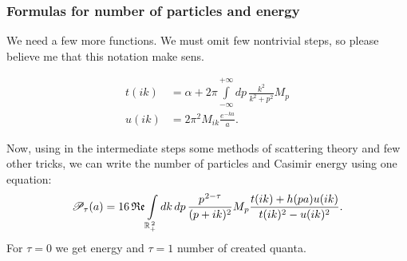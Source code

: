 \documentclass[10pt,t]{beamer}
\begin{document}
\begin{frame}
  \frametitle{Formulas for number of particles and energy}



  We need a few more functions. We must omit few nontrivial
  steps, so please believe me that this notation make sens.

  \vspace{-2em}



  \begin{subequations}

    \begin{align}
      \label{eq:Scalar-field-and-two-quasi-deltas-08-A}
      t( i k )
      &=
        \alpha + 2\pi \int\limits_{ -\infty }^{ +\infty } dp \,
        \frac{ k^{ 2 } }{ k^{ 2 } + p^{ 2 } } M_{ p } \\
      \label{eq:Scalar-field-and-two-quasi-deltas-08-B}
      u( i k )
      &=
        2\pi^{ 2 } M_{ i k } \frac{ e^{ -ka } }{ a }.
    \end{align}

  \end{subequations}

  \vspace{-1em}



  Now, using in the intermediate steps some methods of scattering theory
  and few other tricks, we can write the number of particles and Casimir
  energy using one equation:
  \begin{equation}
    \label{eq:Scalar-field-and-two-quasi-deltas-09}
    \mathcal{P}_{ \tau }( a ) =
    16 \operatorname{\mathfrak{Re}} \int\limits_{ \mathbb{R}_{ + }^{ \, 2 } } dk \, dp \,
    \frac{ p^{ \hspace{0.05em} 2 - \tau } }{ ( p + i k )^{ 2 } } M_{ \hspace{0.05em} p }
    \frac{ t( i k ) + h( p a ) u( i k ) }{ t( i k )^{ 2 } - u( i k )^{ 2 } }.
  \end{equation}
  For $\tau = 0$ we get energy and $\tau = 1$ number of created quanta.

\end{frame}
\end{document}
